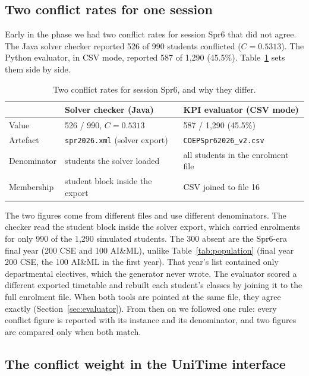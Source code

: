 \documentclass[journal]{IEEEtran}
\begin{document}
\subsection{Two conflict rates for one session}
\label{sec:reconcile}

Early in the phase we had two conflict rates for session Spr6 that did not agree. The Java solver checker reported 526 of 990 students conflicted ($C=0.5313$). The Python evaluator, in CSV mode, reported 587 of 1{,}290 (45.5\%). Table~\ref{tab:reconcile} sets them side by side.

\begin{table}[t]
\centering
\caption{Two conflict rates for session Spr6, and why they differ.}
\label{tab:reconcile}
\scriptsize
\begin{tabular}{@{}lll@{}}
\toprule
 & Solver checker (Java) & KPI evaluator (CSV mode) \\
\midrule
Value & 526 / 990, $C=0.5313$ & 587 / 1{,}290 (45.5\%) \\
Artefact & \texttt{spr2026.xml} (solver export) & \texttt{COEPSpr62026\_v2.csv} \\
Denominator & students the solver loaded & all students in the enrolment file \\
Membership & student block inside the export & CSV joined to file 16 \\
\bottomrule
\end{tabular}
\end{table}

The two figures come from different files and use different denominators. The checker read the student block inside the solver export, which carried enrolments for only 990 of the 1{,}290 simulated students. The 300 absent are the Spr6-era final year (200 CSE and 100 AI\&ML), unlike Table~\ref{tab:population} (final year 200 CSE, the 100 AI\&ML in the first year). That year's list contained only departmental electives, which the generator never wrote. The evaluator scored a different exported timetable and rebuilt each student's classes by joining it to the full enrolment file. When both tools are pointed at the same file, they agree exactly (Section~\ref{sec:evaluator}). From then on we followed one rule: every conflict figure is reported with its instance and its denominator, and two figures are compared only when both match.

\subsection{The conflict weight in the UniTime interface}
\label{sec:ui-weight}
\end{document}
